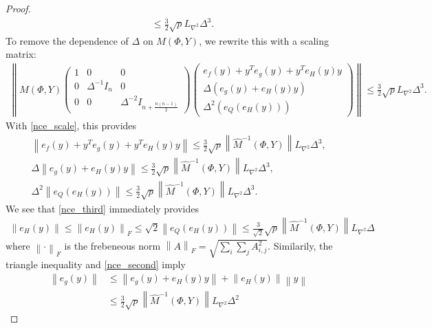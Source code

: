 \begin{proof}
\begin{align*}
&\le
\frac 3 2 \sqrt{p} L_{\nabla^2} \Delta^3.
\end{align*}
To remove the dependence of $\Delta$ on $M(\Phi,Y)$, we rewrite this with a scaling matrix:
\begin{align*}
\left\|M\left(\Phi, Y\right)\begin{pmatrix}
1 & 0 & 0 \\
0 & \Delta^{-1} I_n & 0 \\
0 & 0 & \Delta^{-2} I_{n + \frac{n(n-1)}{2}}
\end{pmatrix}
\begin{pmatrix}
e_f(y) + y^Te_g(y) + y^Te_H(y) y \\
\Delta\left(e_g(y) + e_H(y) y\right) \\
\Delta^2\left(e_Q\left(e_H(y)\right)\right)
\end{pmatrix} \right\|
\le \frac 3 2 \sqrt{p} L_{\nabla^2} \Delta^3.
\end{align*}
With \cref{nce_scale}, this provides
\begin{align}
\left\|e_f(y) + y^Te_g(y) + y^Te_H(y) y \right\|\le \frac 3 2 \sqrt{p} \left\|\hat M^{-1}(\Phi, Y) \right\| L_{\nabla^2} \Delta^3, \label{nce_first}\\
\Delta \left\|e_g(y) + e_H(y) y \right\| \le \frac 3 2 \sqrt{p} \left\|\hat M^{-1}(\Phi, Y) \right\| L_{\nabla^2} \Delta^3, \label{nce_second} \\
\Delta^2 \left\|e_Q\left(e_H(y)\right)\right\| \le \frac 3 2 \sqrt{p} \left\|\hat M^{-1}(\Phi, Y) \right\| L_{\nabla^2} \Delta^3. \label{nce_third}
\end{align}
We see that \cref{nce_third} immediately provides
\begin{align*}
\left\|e_H(y)\right\| \le \left\|e_H(y)\right\|_F \le \sqrt{2} \left\|e_Q\left(e_H(y)\right)\right\| \le \frac 3 {\sqrt 2} \sqrt{p} \left\|\hat M^{-1}(\Phi, Y) \right\| L_{\nabla^2} \Delta
\end{align*}
where $\left\|\cdot\right\|_F$ is the frebeneous norm $\left\|A\right\|_F = \sqrt{\sum_i\sum_jA_{i, j}^2}$.
Similarily, the triangle inequality and \cref{nce_second} imply
\begin{align*}
\left\|e_g\left(y\right)\right\| &\le \left\|e_g(y) + e_H(y) y \right\| + \left\|e_H\left(y\right)\right\|\left\| y\right\| \\
&\le \frac 3 2 \sqrt{p} \left\|\hat M^{-1}(\Phi, Y) \right\| L_{\nabla^2} \Delta^2

\end{align*}
\end{proof}
